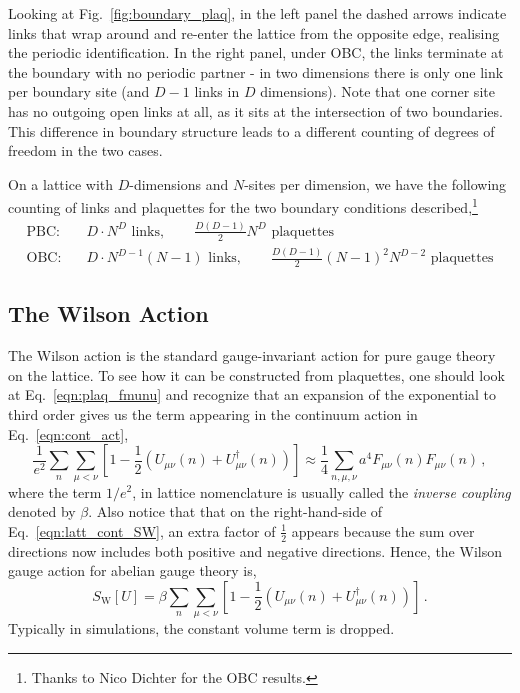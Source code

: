 \documentclass[11pt]{article}
\newcommand{\sideex}[1]{\marginnote{\footnotesize\textcolor{red!50!black}{#1}}}
\theoremstyle{definition}
\begin{document}
Looking at Fig.~\ref{fig:boundary_plaq}, in the left panel the dashed arrows 
indicate links that wrap around and re-enter the lattice from the opposite edge, 
realising the periodic identification. In the right panel, under OBC, the links terminate at the boundary with no periodic partner - 
in two dimensions there is only one link per boundary site (and $D-1$ links in 
$D$ dimensions). Note that one corner site has no outgoing open links at all, 
as it sits at the intersection of two boundaries. This difference in boundary structure leads to a different counting of degrees of freedom in the two cases.

On a lattice with $D$-dimensions and $N$-sites per dimension, we have the following counting of links and plaquettes for the two boundary conditions described,\footnote{Thanks to Nico Dichter for the OBC results.}
\begin{align}
\text{PBC:} \quad & D \cdot N^D \text{ links}, \qquad 
    \frac{D(D-1)}{2} N^D \text{ plaquettes} \\
\text{OBC:} \quad & D \cdot N^{D-1}(N-1) \text{ links}, \qquad 
    \frac{D(D-1)}{2}(N-1)^2 N^{D-2} \text{ plaquettes}
\end{align}

\subsection*{The Wilson Action}
The Wilson action is the standard gauge-invariant action for pure gauge theory on the lattice. To see how it can be constructed from plaquettes, one should look at Eq.~\eqref{eqn:plaq_fmunu} and recognize that an expansion of the exponential to third order gives us the term appearing in the continuum action in Eq.~\eqref{eqn:cont_act},
\begin{equation}\label{eqn:latt_cont_SW}
  \frac{1}{e^2}\sum_{n} \sum_{\mu<\nu} \left[1 -  \frac{1}{2} (U_{\mu\nu}(n) + U^{\dagger}_{\mu\nu}(n)) \right] \approx \frac{1}{4}\sum_{n,\mu,\nu} a^4 F_{\mu\nu}(n)F_{\mu\nu}(n)\,,
\end{equation}
where the term $1/e^2$, in lattice nomenclature is usually called the \textit{inverse coupling} denoted by $\beta$. Also notice that that on the right-hand-side of Eq.~\eqref{eqn:latt_cont_SW}, an extra factor of $\frac{1}{2}$ appears because the sum over directions now includes both positive and negative directions\sideex{There is an exercise in the second sheet related to the lattice Wilson action and it's naive continuum limit.}. Hence, the Wilson gauge action for abelian gauge theory is,
\begin{equation}
   S_{\mathrm{W}}[U] = \beta \sum_{n} \sum_{\mu<\nu} \left[1 -  \frac{1}{2} (U_{\mu\nu}(n) + U^{\dagger}_{\mu\nu}(n)) \right]\,.
\end{equation}
Typically in simulations, the constant volume term is dropped. 
\end{document}
